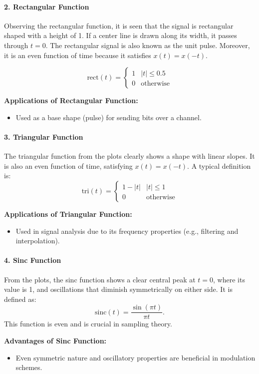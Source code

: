 \documentclass[10pt, twocolumn]{article}
\begin{document}
\paragraph{2. Rectangular Function}
Observing the rectangular function, it is seen that the signal is rectangular shaped with a height of 1. If a center line is drawn along its width, it passes through \(t = 0\). The rectangular signal is also known as the unit pulse. Moreover, it is an even function of time because it satisfies \( x(t) = x(-t) \).

\[
\text{rect}(t) = 
\begin{cases}
1 & |t| \le 0.5 \\
0 & \text{otherwise}
\end{cases}
\]

\textbf{Applications of Rectangular Function:}
\begin{itemize}
    \item Used as a base shape (pulse) for sending bits over a channel.
\end{itemize}

\paragraph{3. Triangular Function}
The triangular function from the plots clearly shows a shape with linear slopes. It is also an even function of time, satisfying \(x(t) = x(-t)\). A typical definition is:
\[
\text{tri}(t) = 
\begin{cases}
1 - |t| & |t| \le 1 \\
0 & \text{otherwise}
\end{cases}
\]

\textbf{Applications of Triangular Function:}
\begin{itemize}
    \item Used in signal analysis due to its frequency properties (e.g., filtering and interpolation).
\end{itemize}

\paragraph{4. Sinc Function}
From the plots, the sinc function shows a clear central peak at \(t = 0\), where its value is 1, and oscillations that diminish symmetrically on either side. It is defined as:
\[
\text{sinc}(t) = \frac{\sin(\pi t)}{\pi t}.
\]
This function is even and is crucial in sampling theory.

\textbf{Advantages of Sinc Function:}
\begin{itemize}
    \item Even symmetric nature and oscillatory properties are beneficial in modulation schemes.
\end{itemize}
\end{document}
